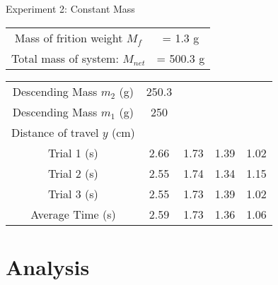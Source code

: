 \documentclass[12pt]{article}
\begin{document}
        {\large Experiment 2: Constant Mass}
        \begin{center}

            \begin{tabular} {|c c|}
                \hline
                Mass of frition weight $M_f$ & = 1.3 g \\
                Total mass of system: $M_{net}$ & = 500.3 g \\
                \hline
            \end{tabular}

            \begin{tabular} {|c|c|c|c|c|}
            \hline %
                Descending Mass $m_2$ (g) & 250.3 &  &  &  \\
                Descending Mass $m_1$ (g) & 250 &  &  &  \\
            \hline
            \hline
                Distance of travel $y$ (cm) &  &  &  &  \\
            \hline
            \hline
                Trial 1 (s) & 2.66 & 1.73 & 1.39 & 1.02 \\
                Trial 2 (s) & 2.55 & 1.74 & 1.34 & 1.15 \\
                Trial 3 (s) & 2.55 & 1.73 & 1.39 & 1.02 \\
                Average Time (s) & 2.59 & 1.73 & 1.36 & 1.06 \\
            \hline
                
            \end{tabular}
        \end{center}
    \section{Analysis}
\end{document}
